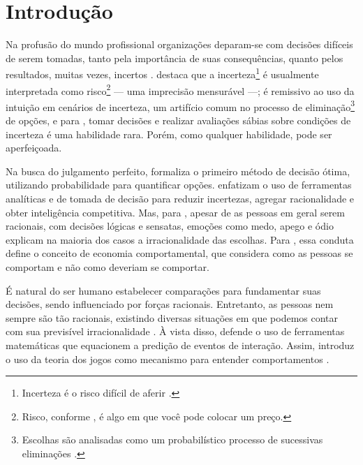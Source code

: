\documentclass[
	article,			        %
	11pt,				          %
	oneside,			        %
	a4paper,			        %
	english,			        %
	brazil,				        %
	sumario=tradicional
]{abntex2}\usepackage[]{graphicx}\usepackage[]{color}
\begin{document}

\textual

\section*{Introdução}

Na profusão do mundo profissional organizações deparam-se com decisões difíceis de serem tomadas, tanto pela importância de suas consequências, quanto pelos resultados, muitas vezes, incertos \cite{Bekman.2009}.  destaca que a incerteza\footnote{Incerteza é o risco difícil de aferir \cite{Nate.2012}.} é usualmente interpretada como risco\footnote{Risco, conforme , é algo em que você pode colocar um preço.} --- uma imprecisão mensurável ---;  é remissivo ao uso da intuição em cenários de incerteza, um artifício comum no processo de eliminação\footnote{Escolhas são analisadas como um probabilístico processo de sucessivas eliminações \cite{Tversky.1972}.} de opções, e para , tomar decisões e realizar avaliações sábias sobre condições de incerteza é uma habilidade rara. Porém, como qualquer habilidade, pode ser aperfeiçoada.

Na busca do julgamento perfeito,  formaliza o primeiro método de decisão ótima, utilizando probabilidade para quantificar opções.  enfatizam o uso de ferramentas analíticas e de tomada de decisão para reduzir incertezas, agregar racionalidade e obter inteligência competitiva. Mas, para , apesar de as pessoas em geral serem racionais, com decisões lógicas e sensatas, emoções como medo, apego e ódio explicam na maioria dos casos a irracionalidade das escolhas. Para , essa conduta define o conceito de economia comportamental, que considera como as pessoas se comportam e não como deveriam se comportar. 

É natural do ser humano estabelecer comparações para fundamentar suas decisões, sendo influenciado por forças racionais. Entretanto, as pessoas nem sempre são tão racionais, existindo diversas situações em que podemos contar com sua previsível irracionalidade \cite{Ariely.2012}. À vista disso,  defende o uso de ferramentas matemáticas que equacionem a predição de eventos de interação. Assim, introduz o uso da teoria dos jogos como mecanismo para entender comportamentos \cite[min.~2:17--2:37]{MesquitaTED.2009}.
\end{document}
